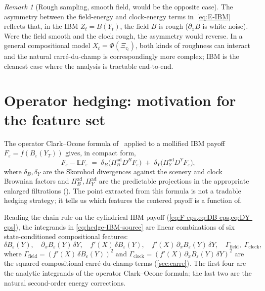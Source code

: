\documentclass[11pt,reqno]{amsart}
\theoremstyle{plain}
\theoremstyle{definition}
\theoremstyle{remark}
\newtheorem{remark}[theorem]{Remark}
\newcommand{\E}{\mathbb E}
\newcommand{\IBM}{Z}
\newcommand{\Bvar}{B}
\newcommand{\Yclock}{Y}
\newcommand{\Piad}{\Pi^{\mathrm{ad}}}
\begin{document}
\begin{remark}[Rough sampling, smooth field, would be the
opposite case]\label{rem:rough-sampling-smooth-field}
The asymmetry between the field-energy and clock-energy terms
in~\eqref{eq:E-IBM} reflects that, in the IBM
$\IBM_{t}=\Bvar(\Yclock_{t})$, the field $\Bvar$ is rough
($\partial_{x}\Bvar$ is white noise). Were the field smooth and
the clock rough, the asymmetry would reverse. In a general
compositional model $X_{t}=\Phi(\Xi_{\tau_{t}})$, both kinds of
roughness can interact and the natural carr\'e-du-champ is
correspondingly more complex; IBM is the cleanest case where
the analysis is tractable end-to-end.
\end{remark}

\section{Operator hedging: motivation for the feature set}\label{sec:operator-hedging}

The operator Clark--Ocone formula
of~\cite[\S 7]{OperatorClarkOcone} applied to a mollified IBM
payoff $F_{\varepsilon}=f(\Bvar_{\varepsilon}(\Yclock_{T}))$
gives, in compact form,
\begin{equation}\label{eq:hedge-IBM-source}
  F_{\varepsilon}-\E F_{\varepsilon}
   \;=\;\delta_{\Bvar}\bigl(\Piad_{\Bvar}D^{\Bvar}F_{\varepsilon}\bigr)
        \;+\;\delta_{\Yclock}\bigl(\Piad_{\Yclock}D^{\Yclock}F_{\varepsilon}\bigr),
\end{equation}
where $\delta_{\Bvar},\delta_{\Yclock}$ are the Skorohod
divergences against the scenery and clock Brownian factors and
$\Piad_{\Bvar},\Piad_{\Yclock}$ are the predictable projections
in the appropriate enlarged filtrations
(\cite[\S 7.3]{OperatorClarkOcone}). The point extracted from
this formula is not a tradable hedging strategy; it tells us
which features the centered payoff is a function of.

Reading the chain rule on the cylindrical IBM payoff
(\cref{eq:F-eps,eq:DB-eps,eq:DY-eps}), the integrands in
\eqref{eq:hedge-IBM-source} are linear combinations of six
state-conditioned compositional features:
\begin{equation}\label{eq:op-feature-set}
  \delta\Bvar_{\varepsilon}(\Yclock),\quad
  \partial_{x}\Bvar_{\varepsilon}(\Yclock)\,\delta\Yclock,\quad
  f'(X)\,\delta\Bvar_{\varepsilon}(\Yclock),\quad
  f'(X)\,\partial_{x}\Bvar_{\varepsilon}(\Yclock)\,\delta\Yclock,\quad
  \Gamma_{\mathrm{field}},\;\Gamma_{\mathrm{clock}},
\end{equation}
where
$\Gamma_{\mathrm{field}}=(f'(X)\,\delta\Bvar_{\varepsilon}(\Yclock))^{2}$
and
$\Gamma_{\mathrm{clock}}=(f'(X)\,\partial_{x}\Bvar_{\varepsilon}(\Yclock)\,\delta\Yclock)^{2}$
are the squared compositional carr\'e-du-champ terms
(\cref{sec:carre}). The first four are the analytic integrands
of the operator Clark--Ocone formula; the last two are the
natural second-order energy corrections.
\end{document}
